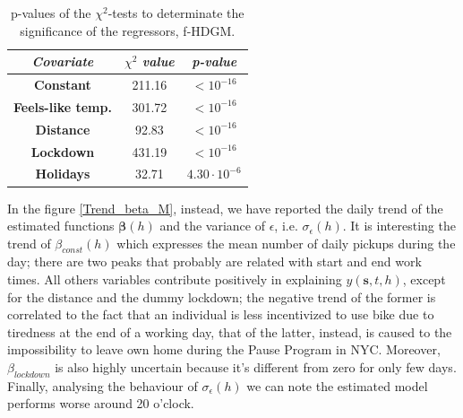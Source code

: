 \begin{table}
	\centering
	\renewcommand\arraystretch{1.3}
	\begin{tabular}{c|c|c}
		\hline
		\textit{Covariate} & $\chi^2$ \textit{value} & \textit{p-value} \\
		\hline
		\textbf{Constant} & \num{211.16} & $< 10^{-16}$ \\
		\hline
		\textbf{Feels-like temp.} & \num{301.72} & $< 10^{-16}$ \\
		\hline
		\textbf{Distance} & \num{92.83} & $<10^{-16}$ \\
		\hline
		\textbf{Lockdown} & \num{431.19} & $<10^{-16}$ \\
		\hline
		\textbf{Holidays} & \num{32.71} & $4.30 \cdot 10^{-6}$ \\
		\hline
	\end{tabular}
	\caption[p-values of the $\chi^2$-tests to determinate the significance of the regressors (f-HDGM)]{p-values of the $\chi^2$-tests to determinate the significance of the regressors, f-HDGM.}
	\label{Chi2_p_values}
\end{table}

\noindent
In the figure \ref{Trend_beta_M}, instead, we have reported the daily trend of the estimated functions $\boldsymbol{\beta}(h)$ and the variance of $\epsilon$, i.e. $\sigma_{\epsilon}(h)$. It is interesting the trend of $\beta_{const}(h)$ which expresses the mean number of daily pickups during the day; there are two peaks that probably are related with start and end work times. All others variables contribute positively in explaining $y(\boldsymbol{s}, t, h)$, except for the distance and the dummy lockdown; the negative trend of the former is correlated to the fact that an individual is less incentivized to use bike due to tiredness at the end of a working day, that of the latter, instead, is caused to the impossibility to leave own home during the Pause Program in NYC. Moreover, $\beta_{lockdown}$ is also highly uncertain because it's different from zero for only few days. Finally, analysing the behaviour of $\sigma_{\epsilon}(h)$ we can note the estimated model performs worse around 20 o'clock.

